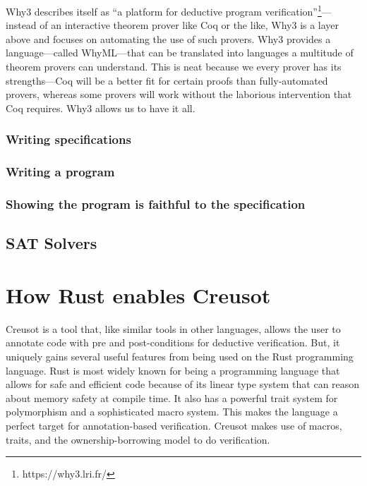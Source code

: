 \documentclass[12pt]{article}
\begin{document}

Why3 describes itself as ``a platform for deductive program verification''\footnote{https://why3.lri.fr/}---instead of an interactive theorem prover like Coq or the like, Why3 is a layer above and focuses on automating the use of such provers.\cite{bobotWhy3ShepherdYour}
Why3 provides a language---called WhyML---that can be translated into languages a multitude of theorem provers can understand.
This is neat because we every prover has its strengths---Coq will be a better fit for certain proofs than fully-automated provers, whereas some provers will work without the laborious intervention that Coq requires.
Why3 allows us to have it all.

\subsubsection{Writing specifications}


\subsubsection{Writing a program}

\subsubsection{Showing the program is faithful to the specification}

\subsection{SAT Solvers}


\section{How Rust enables Creusot}


Creusot is a tool that, like similar tools in other languages, allows the user to annotate code with pre and post-conditions for deductive verification.
But, it uniquely gains several useful features from being used on the Rust programming language. 
Rust is most widely known for being a programming language that allows for safe and efficient code because of its linear type system that can reason about memory safety at compile time. 
It also has a powerful trait system for polymorphism and a sophisticated macro system. 
This makes the language a perfect target for annotation-based verification. 
Creusot makes use of macros, traits, and the ownership-borrowing model to do verification. 
\end{document}
